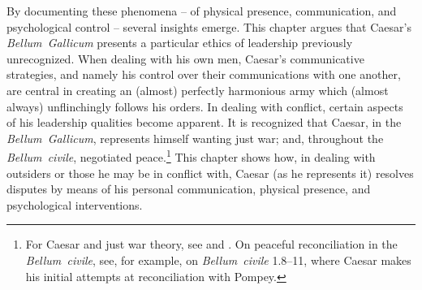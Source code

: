 \documentclass[12pt,letterpaper,oneside,final]{memoir}
\begin{document}
By documenting these phenomena -- of physical presence, communication, and  psychological control -- several insights emerge. This chapter argues that Caesar's \emph{Bellum~Gallicum} presents a particular ethics of leadership previously unrecognized. When dealing with his own men, Caesar's communicative strategies, and namely his control over their communications with one another, are central in creating an (almost) perfectly harmonious army which (almost always) unflinchingly follows his orders. In dealing with conflict, certain aspects of his leadership qualities become apparent. It is recognized that Caesar, in the \emph{Bellum~Gallicum}, represents himself wanting just war; and, throughout the \emph{Bellum~civile}, negotiated peace.\footnote{For Caesar and just war theory, see \textcite{siebenborn1990} and \textcite[157--189]{riggsby2006}. On peaceful reconciliation in the \emph{Bellum~civile}, see, for example, \textcite[57--60]{batstonedamon2006} on \emph{Bellum~civile} 1.8--11, where Caesar makes his initial attempts at reconciliation with Pompey.} This chapter shows how, in dealing with outsiders or those he may be in conflict with, Caesar (as he represents it) resolves disputes by means of his personal communication, physical presence, and psychological interventions. 
\end{document}
